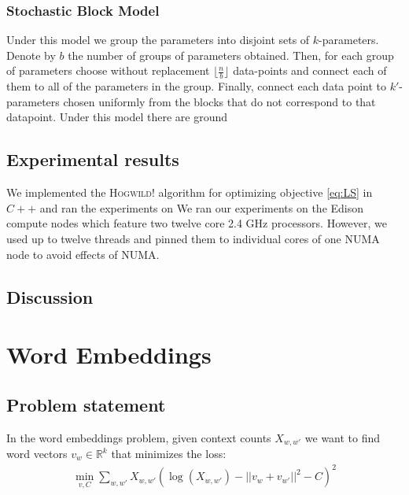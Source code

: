 \documentclass[times,11pt]{article}
\numberwithin{equation}{section}		%
\numberwithin{figure}{section}			%
\numberwithin{table}{section}				%
\newcommand{\ltwonorm}[1]{\left|\left|{#1}\right|\right|}
\newcommand{\HW}{\textsc{Hogwild!}}
\begin{document}
\subsubsection*{Stochastic Block Model}

Under this model we group the parameters into disjoint sets of $k$-parameters. Denote by $b$ the number of groups of parameters obtained. Then, for each group of parameters choose without replacement $\lfloor \frac{n}{b}\rfloor$ data-points and connect each of them to all of the parameters in the group. Finally, connect each data point to $k'$-parameters chosen uniformly from the blocks that do not correspond to that datapoint. Under this model there are ground 

\subsection{Experimental results}

We implemented the \HW{} algorithm for optimizing objective \eqref{eq:LS} in $C++$ and ran the experiments on 
We ran our experiments on the Edison compute nodes which feature two twelve core 2.4 GHz processors. 
However, we used up to twelve threads and pinned them to individual cores of one NUMA node to avoid effects of NUMA.








\subsection{Discussion}















\section{Word Embeddings}\label{sec:w2v}

\subsection{Problem statement}
In the word embeddings problem, given context counts $X_{w,w'}$ we want to find word vectors
$v_{w} \in \mathbb{R}^{k}$ that minimizes the loss:
\begin{align*}
\min_{v,C}\sum_{w,w'}X_{w,w'} \left(\log(X_{w,w'}) - \ltwonorm{v_w+v_{w'}}^2 - C\right)^2
\end{align*}
\end{document}
